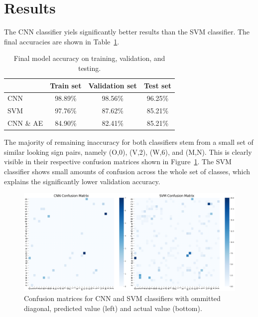 \documentclass[a4, 10 pt, conference]{ieeeconf}  %
\begin{document}
\section{Results}
\label{sec:results}

The CNN classifier yiels significantly better results than the SVM classifier.
The final accuracies are shown in Table~\ref{tab:classifier_accuracy}.


\begin{table}[H]
  \centering
  \begin{tabular}{|l|c|c|c|}
    \hline
              & Train set & Validation set & Test set \\
    \hline
    CNN       & 98.89\%   & 98.56\%        & 96.25\%  \\
    SVM       & 97.76\%   & 87.62\%        & 85.21\%  \\
    CNN \& AE & 84.90\%   & 82.41\%        & 85.21\%  \\
    \hline
  \end{tabular}
  \caption{Final model accuracy on training, validation, and testing.}
  \label{tab:classifier_accuracy}
\end{table}

\vspace{-1.5em}

The majority of remaining inaccuracy for both classifiers stem from a small set of similar
looking sign pairs, namely (O,0), (V,2), (W,6), and (M,N). This is clearly visible
in their respective confusion matrices shown in Figure~\ref{fig:cm}. The SVM
classifier shows small amounts of confusion across the whole set of classes,
which explains the significantly lower validation accuracy.

\begin{figure}[htb]
  \centering
  \includegraphics[width=\linewidth]{../images/cm_comparison.png}
  \caption{Confusion matrices for CNN and SVM classifiers with ommitted diagonal, predicted value (left) and actual value (bottom).}
  \label{fig:cm}
\end{figure}
\end{document}
